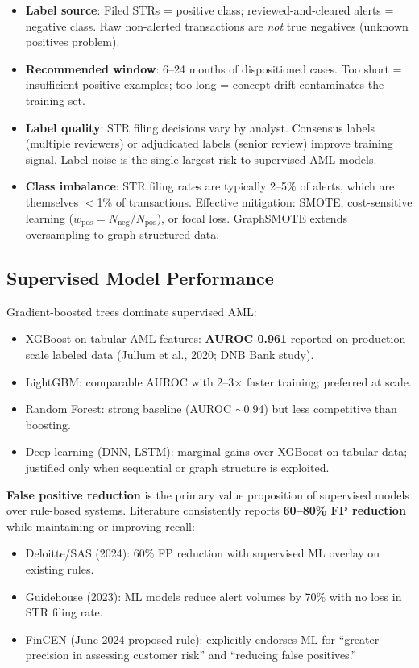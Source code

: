 \documentclass[11pt]{article}
\begin{document}
\begin{itemize}
\item \textbf{Label source}: Filed STRs = positive class; reviewed-and-cleared alerts = negative class. Raw non-alerted transactions are \emph{not} true negatives (unknown positives problem).
\item \textbf{Recommended window}: 6--24 months of dispositioned cases. Too short = insufficient positive examples; too long = concept drift contaminates the training set.
\item \textbf{Label quality}: STR filing decisions vary by analyst. Consensus labels (multiple reviewers) or adjudicated labels (senior review) improve training signal. Label noise is the single largest risk to supervised AML models.
\item \textbf{Class imbalance}: STR filing rates are typically 2--5\% of alerts, which are themselves $<$1\% of transactions. Effective mitigation: SMOTE, cost-sensitive learning ($w_{\text{pos}} = N_{\text{neg}} / N_{\text{pos}}$), or focal loss. GraphSMOTE extends oversampling to graph-structured data.
\end{itemize}

\subsection{Supervised Model Performance}

Gradient-boosted trees dominate supervised AML:
\begin{itemize}
\item XGBoost on tabular AML features: \textbf{AUROC 0.961} reported on production-scale labeled data (Jullum et al., 2020; DNB Bank study).
\item LightGBM: comparable AUROC with 2--3$\times$ faster training; preferred at scale.
\item Random Forest: strong baseline (AUROC $\sim$0.94) but less competitive than boosting.
\item Deep learning (DNN, LSTM): marginal gains over XGBoost on tabular data; justified only when sequential or graph structure is exploited.
\end{itemize}

\textbf{False positive reduction} is the primary value proposition of supervised models over rule-based systems. Literature consistently reports \textbf{60--80\% FP reduction} while maintaining or improving recall:
\begin{itemize}
\item Deloitte/SAS (2024): 60\% FP reduction with supervised ML overlay on existing rules.
\item Guidehouse (2023): ML models reduce alert volumes by 70\% with no loss in STR filing rate.
\item FinCEN (June 2024 proposed rule): explicitly endorses ML for ``greater precision in assessing customer risk'' and ``reducing false positives.''
\end{itemize}
\end{document}
